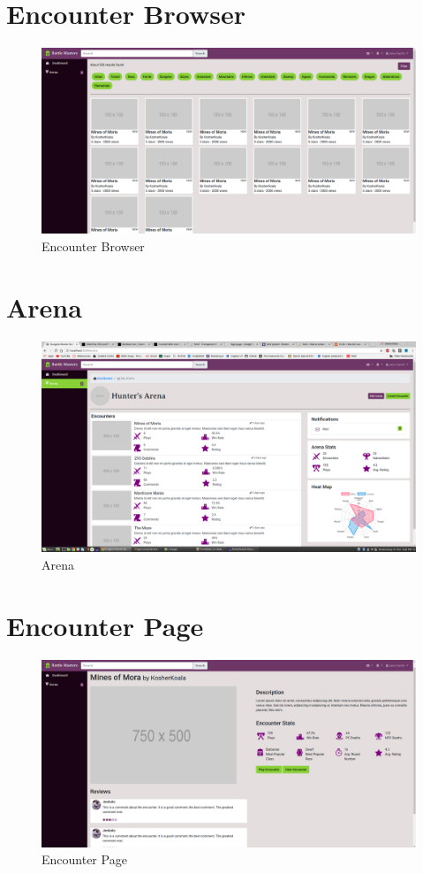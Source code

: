 \documentclass[12pt,a4paper]{report}
\begin{document}
	\section{Encounter Browser}
	\begin{figure}[H]
		\centering
		\includegraphics[scale=.19]{search}
		\caption{Encounter Browser}
		\label{fig: Encounter Browser}
	\end{figure}
	\section{Arena}
	\begin{figure}[H]
		\centering
		\includegraphics[scale=.20]{arena}
		\caption{Arena}
		\label{fig: Arena}
	\end{figure}
	\section{Encounter Page}
	\begin{figure}[H]
		\centering
		\includegraphics[scale=.20]{encounter}
		\caption{Encounter Page}
		\label{fig: Encounter Page}
	\end{figure}
	
\end{document}
